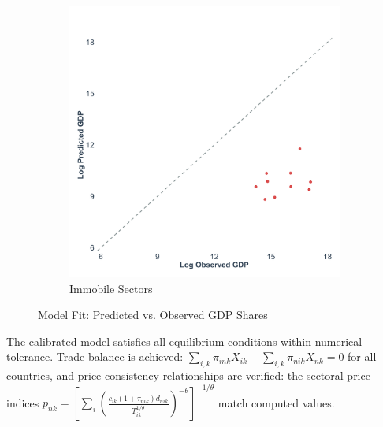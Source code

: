 \begin{figure}[H]
\begin{subfigure}{0.48\textwidth}
        \includegraphics[width=\textwidth]{code/figures/gdp_fit_immobile.png}
        \caption{Immobile Sectors}
        \label{fig:gdp_fit_immobile}
    \end{subfigure}
    \caption{Model Fit: Predicted vs. Observed GDP Shares}
    \label{fig:gdp_fit}
\end{figure}


The calibrated model satisfies all equilibrium conditions within numerical tolerance. Trade balance is achieved: $\sum_{i,k} \pi_{ink} X_{ik} - \sum_{i,k} \pi_{nik} X_{nk} = 0$ for all countries, and price consistency relationships are verified: the sectoral price indices $p_{nk} = \left[\sum_{i} \left(\frac{c_{ik}(1+\tau_{nik})d_{nik}}{T_{ik}^{1/\theta}}\right)^{-\theta}\right]^{-1/\theta}$ match computed values. 